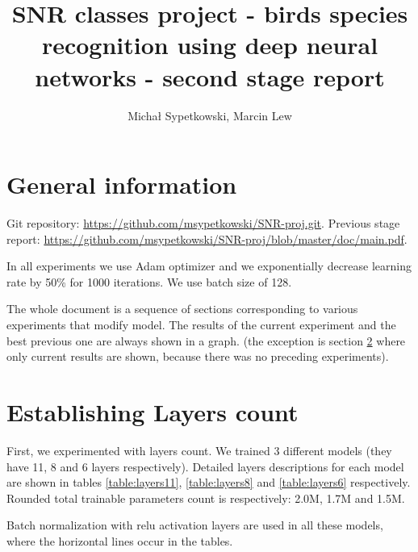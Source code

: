 \documentclass[a4paper]{article}
\begin{document}
\title{SNR classes project - birds species recognition using deep neural networks
- second stage report}

\author{Michał Sypetkowski, Marcin Lew}
\twocolumn
\maketitle


\section{General information}
Git repository:\newline
\url{https://github.com/msypetkowski/SNR-proj.git}.\newline
Previous stage report: \newline
\url{https://github.com/msypetkowski/SNR-proj/blob/master/doc/main.pdf}.

In all experiments we use Adam optimizer and we exponentially
decrease learning rate by 50\% for 1000 iterations.
We use batch size of 128.

The whole document is a sequence of sections corresponding to various experiments that modify model. 
The results of the current experiment and the best previous one are always shown in a graph.
(the exception is section \ref{expLayer} where only current results are shown, because there was no preceding experiments).

\section{Establishing Layers count}
\label{expLayer}

First, we experimented with layers count.
    We trained 3 different models (they have 11, 8 and 6 layers respectively).
Detailed layers descriptions for each model are shown in tables
\ref{table:layers11},
\ref{table:layers8} and
\ref{table:layers6} respectively.
Rounded total trainable parameters count is respectively: 2.0M, 1.7M  and 1.5M.

Batch normalization with relu activation layers are used in all these models,
where the horizontal lines occur in the tables.
\end{document}
